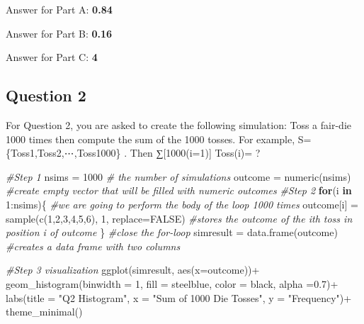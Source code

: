 \documentclass[
]{article}
\newenvironment{Shaded}{\begin{snugshade}}{\end{snugshade}}
\newcommand{\AttributeTok}[1]{\textcolor[rgb]{0.77,0.63,0.00}{#1}}
\newcommand{\CommentTok}[1]{\textcolor[rgb]{0.56,0.35,0.01}{\textit{#1}}}
\newcommand{\ConstantTok}[1]{\textcolor[rgb]{0.00,0.00,0.00}{#1}}
\newcommand{\ControlFlowTok}[1]{\textcolor[rgb]{0.13,0.29,0.53}{\textbf{#1}}}
\newcommand{\DecValTok}[1]{\textcolor[rgb]{0.00,0.00,0.81}{#1}}
\newcommand{\FloatTok}[1]{\textcolor[rgb]{0.00,0.00,0.81}{#1}}
\newcommand{\FunctionTok}[1]{\textcolor[rgb]{0.00,0.00,0.00}{#1}}
\newcommand{\NormalTok}[1]{#1}
\newcommand{\OtherTok}[1]{\textcolor[rgb]{0.56,0.35,0.01}{#1}}
\newcommand{\SpecialCharTok}[1]{\textcolor[rgb]{0.00,0.00,0.00}{#1}}
\newcommand{\StringTok}[1]{\textcolor[rgb]{0.31,0.60,0.02}{#1}}
\begin{document}
Answer for Part A: \textbf{0.84}

Answer for Part B: \textbf{0.16}

Answer for Part C: \textbf{4}

\hypertarget{question-2}{%
\subsection{Question 2}\label{question-2}}

For Question 2, you are asked to create the following simulation: Toss a
fair-die 1000 times then compute the sum of the 1000 tosses. For
example, S=\{Toss1,Toss2,⋯,Toss1000\} . Then ∑{[}1000(i=1){]} Toss(i)= ?

\begin{Shaded}
\begin{Highlighting}[]
\CommentTok{\#Step 1}
\NormalTok{nsims }\OtherTok{=} \DecValTok{1000}  \CommentTok{\# the number of simulations}
\NormalTok{outcome }\OtherTok{=} \FunctionTok{numeric}\NormalTok{(nsims) }\CommentTok{\#create empty vector that will be filled with numeric outcomes}
\CommentTok{\#Step 2}
\ControlFlowTok{for}\NormalTok{(i }\ControlFlowTok{in} \DecValTok{1}\SpecialCharTok{:}\NormalTok{nsims)\{ }\CommentTok{\#we are going to perform the body of the loop 1000 times}
\NormalTok{  outcome[i] }\OtherTok{=} \FunctionTok{sample}\NormalTok{(}\FunctionTok{c}\NormalTok{(}\DecValTok{1}\NormalTok{,}\DecValTok{2}\NormalTok{,}\DecValTok{3}\NormalTok{,}\DecValTok{4}\NormalTok{,}\DecValTok{5}\NormalTok{,}\DecValTok{6}\NormalTok{), }\DecValTok{1}\NormalTok{, }\AttributeTok{replace=}\ConstantTok{FALSE}\NormalTok{) }\CommentTok{\#stores the outcome of the ith toss in position i of outcome}
\NormalTok{  \}  }\CommentTok{\#close the for{-}loop}
\NormalTok{simresult }\OtherTok{=} \FunctionTok{data.frame}\NormalTok{(outcome) }\CommentTok{\#creates a data frame with two columns}

\CommentTok{\#Step 3 visualization}
\FunctionTok{ggplot}\NormalTok{(simresult, }\FunctionTok{aes}\NormalTok{(}\AttributeTok{x=}\NormalTok{outcome))}\SpecialCharTok{+}
     \FunctionTok{geom\_histogram}\NormalTok{(}\AttributeTok{binwidth =} \DecValTok{1}\NormalTok{, }\AttributeTok{fill =} \StringTok{\textquotesingle{}steelblue\textquotesingle{}}\NormalTok{, }\AttributeTok{color =} \StringTok{\textquotesingle{}black\textquotesingle{}}\NormalTok{, }\AttributeTok{alpha =}\FloatTok{0.7}\NormalTok{)}\SpecialCharTok{+}
     \FunctionTok{labs}\NormalTok{(}\AttributeTok{title =} \StringTok{"Q2 Histogram"}\NormalTok{, }\AttributeTok{x =} \StringTok{"Sum of 1000 Die Tosses"}\NormalTok{, }\AttributeTok{y =} \StringTok{"Frequency"}\NormalTok{)}\SpecialCharTok{+}
     \FunctionTok{theme\_minimal}\NormalTok{()}
\end{Highlighting}
\end{Shaded}
\end{document}
